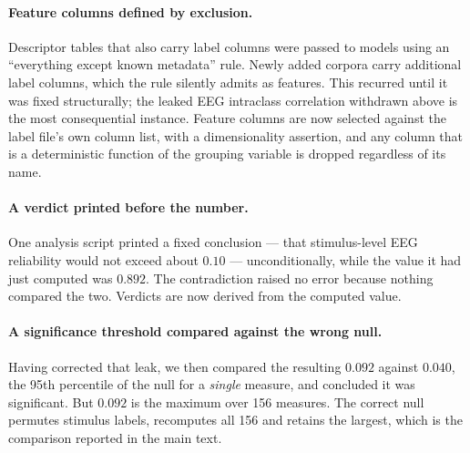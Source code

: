 \paragraph{Feature columns defined by exclusion.}
Descriptor tables that also carry label columns were passed to models using an
``everything except known metadata'' rule. Newly added corpora carry additional label
columns, which the rule silently admits as features. This recurred until it was fixed
structurally; the leaked EEG intraclass correlation withdrawn above is the most
consequential instance. Feature columns are now selected against the label file's own
column list, with a dimensionality assertion, and any column that is a deterministic
function of the grouping variable is dropped regardless of its name.

\paragraph{A verdict printed before the number.}
One analysis script printed a fixed conclusion --- that stimulus-level EEG reliability
would not exceed about $0.10$ --- unconditionally, while the value it had just computed
was $0.892$. The contradiction raised no error because nothing compared the two.
Verdicts are now derived from the computed value.

\paragraph{A significance threshold compared against the wrong null.}
Having corrected that leak, we then compared the resulting $0.092$ against $0.040$, the
95th percentile of the null for a \emph{single} measure, and concluded it was
significant. But $0.092$ is the maximum over 156 measures. The correct null permutes
stimulus labels, recomputes all 156 and retains the largest, which is the comparison
reported in the main text.

\clearpage
